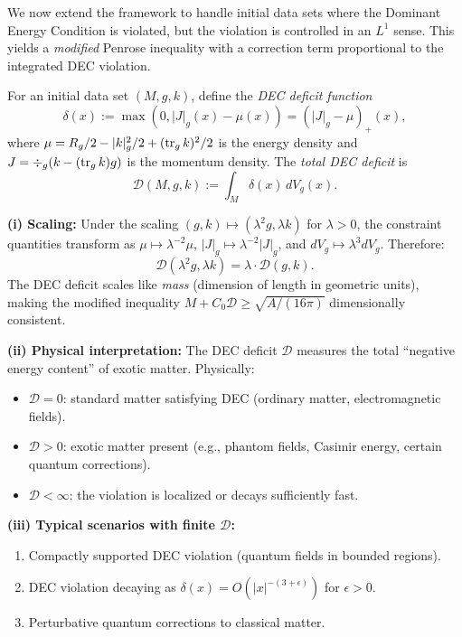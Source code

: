 We now extend the framework to handle initial data sets where the Dominant Energy Condition is violated, but the violation is controlled in an $L^1$ sense. This yields a \emph{modified} Penrose inequality with a correction term proportional to the integrated DEC violation.

\begin{definition}
For an initial data set $(M, g, k)$, define the \emph{DEC deficit function}
\begin{equation}
    \delta(x) := \max(0, |J|_g(x) - \mu(x)) = (|J|_g - \mu)_+(x),
\end{equation}
where $\mu = R_g/2 - |k|_g^2/2 + (\operatorname{tr}_g k)^2/2$ is the energy density and $J = \div_g(k - (\operatorname{tr}_g k)g)$ is the momentum density. The \emph{total DEC deficit} is
\begin{equation}
    \mathcal{D}(M,g,k) := \int_M \delta(x) \, dV_g(x).
\end{equation}
\end{definition}

\begin{remark}
\textbf{(i) Scaling:} Under the scaling $(g, k) \mapsto (\lambda^2 g, \lambda k)$ for $\lambda > 0$, the constraint quantities transform as $\mu \mapsto \lambda^{-2}\mu$, $|J|_g \mapsto \lambda^{-2}|J|_g$, and $dV_g \mapsto \lambda^3 dV_g$. Therefore:
\[
    \mathcal{D}(\lambda^2 g, \lambda k) = \lambda \cdot \mathcal{D}(g, k).
\]
The DEC deficit scales like \emph{mass} (dimension of length in geometric units), making the modified inequality $M + C_0\mathcal{D} \ge \sqrt{A/(16\pi)}$ dimensionally consistent.

\textbf{(ii) Physical interpretation:} The DEC deficit $\mathcal{D}$ measures the total ``negative energy content'' of exotic matter. Physically:
\begin{itemize}
    \item $\mathcal{D} = 0$: standard matter satisfying DEC (ordinary matter, electromagnetic fields).
    \item $\mathcal{D} > 0$: exotic matter present (e.g., phantom fields, Casimir energy, certain quantum corrections).
    \item $\mathcal{D} < \infty$: the violation is localized or decays sufficiently fast.
\end{itemize}

\textbf{(iii) Typical scenarios with finite $\mathcal{D}$:}
\begin{enumerate}
    \item Compactly supported DEC violation (quantum fields in bounded regions).
    \item DEC violation decaying as $\delta(x) = O(|x|^{-(3+\epsilon)})$ for $\epsilon > 0$.
    \item Perturbative quantum corrections to classical matter.
\end{enumerate}
\end{remark}

